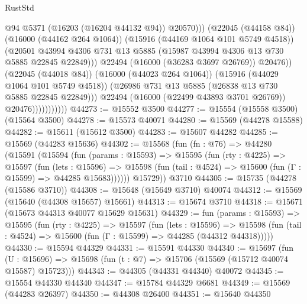 \begin{lexlean}{RustStd}
\begin{coremodule}
                                        @94
                                        @5371
                                        (@16203 (@16204 @44132 @94))
                                        @20570)))
                                  (@22045 (@44158 @84))
                                  (@16000 (@44162 @264 @1064))
                                  (@15916 (@44169 @1064 @101 @5749 @4518))
                                  (@20501
                                    @43994
                                    @4306
                                    @731
                                    @13
                                    @5885
                                    (@15987 @43994 @4306 @13 @730 @5885 @22845 @22849)))
                                @22494
                                (@16000 (@36283 @3697 @26769))
                                @20476))
                            (@22045 (@44018 @84))
                            (@16000 (@44023 @264 @1064))
                            (@15916 (@44029 @1064 @101 @5749 @4518))
                            (@26986 @731 @13 @5885 (@26838 @13 @730 @5885 @22845 @22849)))
                          @22494
                          (@16000 (@22499 @43893 @3701 @26769))
                          @20476)))))))))))
@44273 := @15552 @3500
@44277 := @15554 (@15558 @3500) (@15564 @3500)
@44278 := @15573 @40071
@44280 := @15569 (@44278 @15588)
@44282 := @15611 (@15612 @3500)
@44283 := @15607 @44282
@44285 := @15569 (@44283 @15636)
@44302 := @15568
    (fun (fn : @76) =>
    @44280
      (@15591
        (@15594
          (fun (params : @15593) =>
          @15595
            (fun (rty : @4225) =>
            @15597
              (fun (lets : @15596) =>
              @15598 (fun (tail : @4524) => @15600 (fun (Γ : @15599) => @44285 @15683))))))
        @15729))
    @3710
@44305 := @15735 (@44278 (@15586 @3710))
@44308 := @15648 (@15649 @3710) @40074
@44312 := @15569 (@15640 (@44308 @15657) @15661)
@44313 := @15674 @3710
@44318 := @15671 (@15673 @44313 @40077 @15629 @15631)
@44329 := fun (params : @15593) =>
  @15595
    (fun (rty : @4225) =>
    @15597
      (fun (lets : @15596) =>
      @15598 (fun (tail : @4524) => @15600 (fun (Γ : @15599) => @44285 (@44312 @44318)))))
@44330 := @15594 @44329
@44331 := @15591 @44330
@44340 := @15697
    (fun (U : @15696) => @15698 (fun (t : @7) => @15706 (@15569 (@15712 @40074 @15587) @15723)))
@44343 := @44305 (@44331 @44340) @40072
@44345 := @15554 @44330 @44340
@44347 := @15784 @44329 @6681
@44349 := @15569 (@44283 @26397)
@44350 := @44308 @26400
@44351 := @15640 @44350

\end{coremodule}
\end{lexlean}
